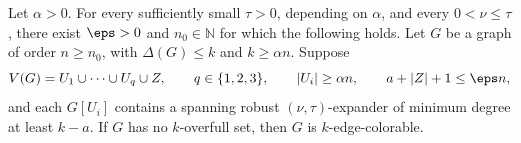 \begin{theorem}\label{three:thm:main}
Let $\alpha>0$. For every sufficiently small $\tau>0$, depending
on $\alpha$, and every $0<\nu\le\tau$, there exist $\eps>0$ and
$n_0\in\mathbb N$ for which the following holds. Let $G$ be a
graph of order $n\ge n_0$, with $\Delta(G)\le k$ and $k\ge\alpha n$.
Suppose
\[
 V(G)=U_1\cup\cdots\cup U_q\cup Z,\qquad q\in\{1,2,3\},
 \qquad |U_i|\ge\alpha n,\qquad a+|Z|+1\le\eps n,
\]
and each $G[U_i]$ contains a spanning robust $(\nu,\tau)$-expander
of minimum degree at least $k-a$. If $G$ has no $k$-overfull set,
then $G$ is $k$-edge-colorable.
\end{theorem}